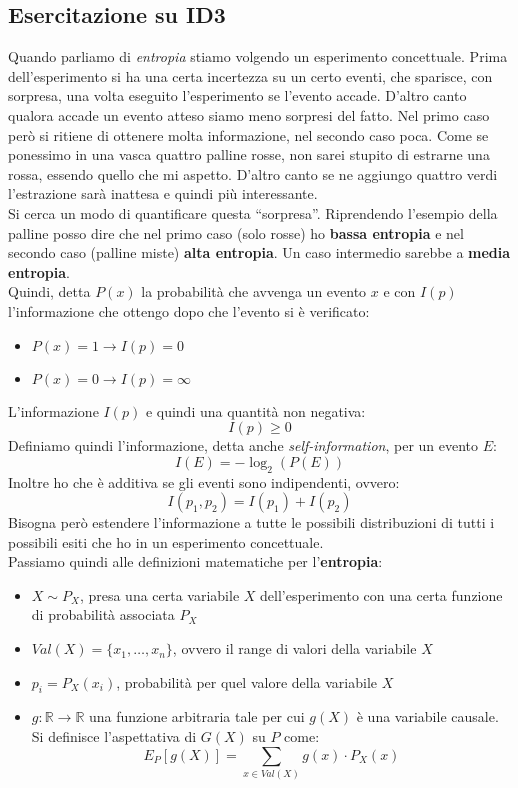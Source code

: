 \subsection{Esercitazione su ID3}
Quando parliamo di \textit{entropia} stiamo volgendo un esperimento
concettuale. Prima dell'esperimento si ha una certa incertezza su un certo
eventi, che sparisce, con sorpresa, una volta eseguito l'esperimento se l'evento
accade. D'altro canto qualora accade un evento atteso siamo meno sorpresi del
fatto. Nel primo caso però si ritiene di ottenere molta informazione, nel
secondo caso poca. Come se ponessimo in una vasca quattro palline rosse, non
sarei stupito di estrarne una rossa, essendo quello che mi aspetto. D'altro
canto se ne aggiungo quattro verdi l'estrazione sarà inattesa e quindi più
interessante.\\ 
Si cerca un modo di quantificare questa ``sorpresa''. Riprendendo l'esempio
della palline posso dire che nel primo caso (solo rosse) ho \textbf{bassa
  entropia} e nel secondo caso (palline miste) \textbf{alta entropia}. Un caso
intermedio sarebbe a \textbf{media entropia}.\\
Quindi, detta $P(x)$ la probabilità che avvenga un evento $x$ e con $I(p)$
l'informazione che ottengo dopo che l'evento si è verificato:
\begin{itemize}
  \item $P(x)=1\to I(p)=0$
  \item $P(x)=0\to I(p)=\infty$
\end{itemize}
L'informazione $I(p)$ e quindi una quantità non negativa:
\[I(p)\geq 0\]
Definiamo quindi l'informazione, detta anche \textit{self-information}, per un
evento $E$: 
\[I(E)=-\log_2(P(E))\]
Inoltre ho che è additiva se gli eventi sono indipendenti, ovvero:
\[I(p_1,p_2)=I(p_1)+I(p_2)\]
Bisogna però estendere l'informazione a tutte le possibili distribuzioni di
tutti i possibili esiti che ho in un esperimento concettuale.\\
Passiamo quindi alle definizioni matematiche per l'\textbf{entropia}:
\begin{itemize}
  \item $X\sim P_X$, presa una certa variabile $X$ dell'esperimento con una
  certa funzione di probabilità associata $P_X$
  \item $Val(X)=\{x_1,\ldots,x_n\}$, ovvero il range di valori della variabile
  $X$
  \item $p_i=P_X(x_i)$, probabilità per quel valore della variabile $X$
  \item $g:\mathbb{R}\to\mathbb{R}$ una funzione arbitraria tale per cui $g(X)$
  è una variabile causale. Si definisce l'aspettativa di $G(X)$ su $P$ come:
  \[E_P[g(X)]=\sum_{x\in Val(X)} g(x)\cdot P_X(x)\]
\end{itemize}
